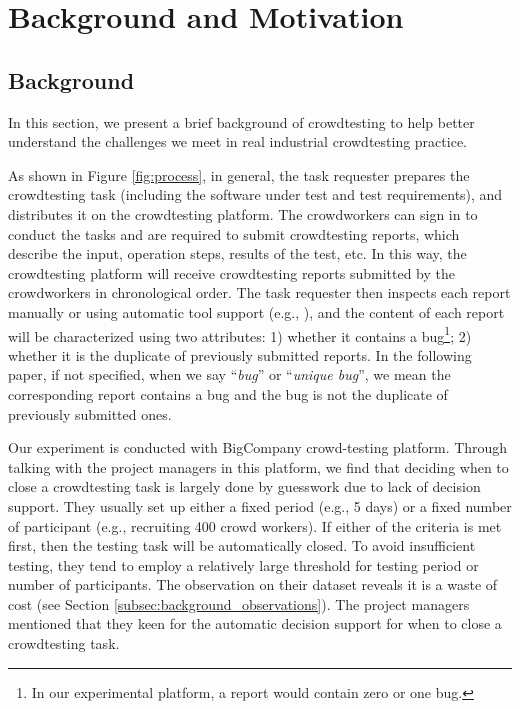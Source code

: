 \documentclass[sigconf,review, anonymous]{acmart}
\newcommand{\company}{BigCompany}
\begin{document}
\section{Background and Motivation}
\label{sec:background}

\subsection{Background}
\label{subsec:background_crowdtesting}

In this section, we present a brief background of crowdtesting to help better understand the challenges we meet in real industrial crowdtesting practice.

As shown in Figure \ref{fig:process}, in general, the task requester prepares the crowdtesting task (including the software under test and test requirements), and distributes it on the crowdtesting platform.
The crowdworkers can sign in to conduct the tasks and are required to submit crowdtesting reports, which describe the input, operation steps, results of the test, etc.
In this way, the crowdtesting platform will receive crowdtesting reports submitted by the crowdworkers in chronological order. 
The task requester then inspects each report manually or using automatic tool support (e.g., \cite{wang2016towards,wang2017domain}), and the content of each report will be characterized using two attributes: 1) whether it contains a bug\footnote{In our experimental platform, a report would contain zero or one bug.}; 2) whether it is the duplicate of previously submitted reports. 
In the following paper, if not specified, when we say ``\textit{bug}'' or ``\textit{unique bug}'', we mean the corresponding report contains a bug and the bug is not the duplicate of previously submitted ones. 





Our experiment is conducted with {\company} crowd-testing platform.
Through talking with the project managers in this platform, we find that deciding when to close a crowdtesting task is largely done by guesswork due to lack of decision support. 
They usually set up either a fixed period (e.g., 5 days) or a fixed number of participant (e.g., recruiting 400 crowd workers).
If either of the criteria is met first, then the testing task will be automatically closed.
To avoid insufficient testing, they tend to employ a relatively large threshold for testing period or number of participants.
The observation on their dataset reveals it is a waste of cost (see Section \ref{subsec:background_observations}).
The project managers mentioned that they keen for the automatic decision support for when to close a crowdtesting task. 
\end{document}
